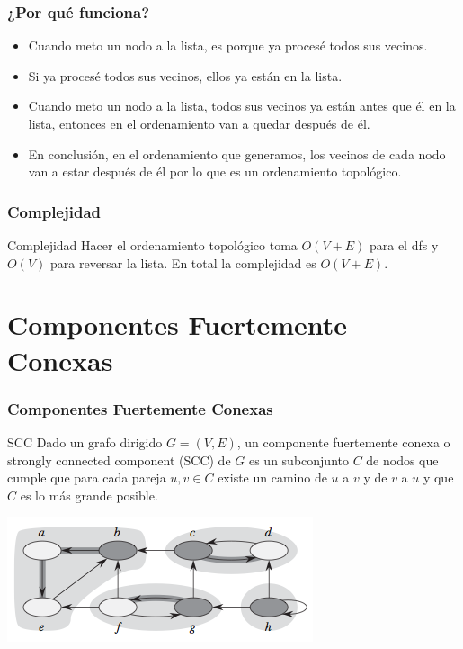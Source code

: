 \documentclass{beamer}
\begin{document}
	\begin{frame}
		\frametitle{¿Por qué funciona?}
		\begin{itemize}
			\item Cuando meto un nodo a la lista, es porque ya procesé todos sus vecinos.
			\item Si ya procesé todos sus vecinos, ellos ya están en la lista.
			\item Cuando meto un nodo a la lista, todos sus vecinos ya están antes que él en la lista, entonces en el ordenamiento van a quedar después de él.
			\item En conclusión, en el ordenamiento que generamos, los vecinos de cada nodo van a estar después de él por lo que es un ordenamiento topológico.
		\end{itemize}
	\end{frame}
	
	\begin{frame}
		\frametitle{Complejidad}
		\begin{block}{Complejidad}
			Hacer el ordenamiento topológico toma $O(V+E)$ para el dfs y $O(V)$ para reversar la lista. En total la complejidad es $O(V+E)$.
		\end{block}
	\end{frame}


\section{Componentes Fuertemente Conexas}
	\begin{frame}
		\frametitle{Componentes Fuertemente Conexas}
		\begin{block}{SCC}
			Dado un grafo dirigido $G = (V, E)$, un componente fuertemente conexa o strongly connected component (SCC) de $G$ es un subconjunto $C$ de nodos que cumple que para cada pareja $u, v \in C$ existe un camino de $u$ a $v$ y de $v$ a $u$ y que $C$ es lo más grande posible. 
		\end{block}
		\begin{center} \includegraphics[height = 0.3\textheight]{scc.png} \end{center}
	\end{frame}
	
\end{document}
